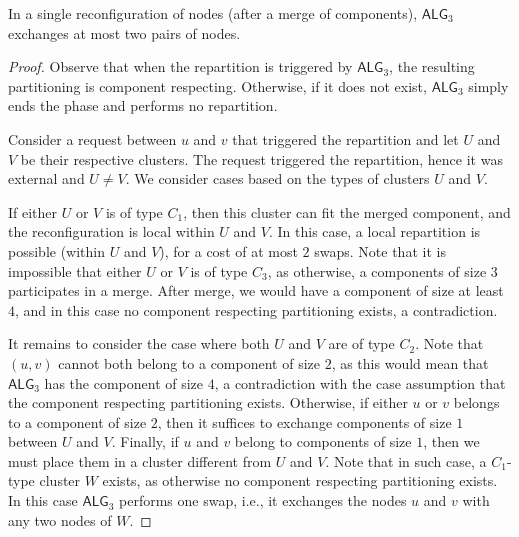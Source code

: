 \documentclass[a4paper,anonymous,USenglish]{lipics-v2019}
\newcommand{\TAlg}{{\ensuremath{\textsf{ALG}_{3}}}\xspace}
\begin{document}
\begin{lemma}
	\label{lem:1req}
	In a single reconfiguration of nodes (after a merge of components), \TAlg exchanges at most two pairs of nodes.
\end{lemma}

\begin{proof}
	Observe that when the repartition is triggered by \TAlg, the resulting partitioning is component respecting.
	Otherwise, if it does not exist, \TAlg simply ends the phase and performs no repartition.
	
	
	Consider a request between $u$ and $v$ that triggered the repartition and let $U$ and $V$ be their respective clusters.
	The request triggered the repartition, hence it was external and $U\neq V$.
	We consider cases based on the types of clusters $U$ and $V$.
	
	If either $U$ or $V$ is of type $C_1$, then this cluster can fit the merged component, and the reconfiguration is local within $U$ and $V$.
	In this case, a local repartition is possible (within $U$ and $V$), for a cost of at most $2$ swaps.
	Note that it is impossible that either $U$ or $V$ is of type $C_3$, as otherwise, a components of size $3$ participates in a merge.
	After merge, we would have a component of size at least $4$, and in this case no component respecting partitioning exists, a contradiction.
	
	
	It remains to consider the case where both $U$ and $V$ are of type $C_2$. Note that $(u,v)$ cannot both belong to a component of size $2$, as this would mean that \TAlg has the component of size $4$, a contradiction with the case assumption that the component respecting partitioning exists. 
	Otherwise, if either $u$ or $v$ belongs to a component of size $2$, then it suffices to exchange components of size $1$ between $U$ and $V$.
	Finally, if $u$ and $v$ belong to components of size $1$, then we must place them in a cluster different from $U$ and $V$.
	Note that in such case, a $C_1$-type cluster $W$ exists, as otherwise no component respecting partitioning exists. In this case \TAlg performs one swap, i.e., it exchanges the nodes $u$ and $v$ with any two nodes of $W$.
\end{proof}
\end{document}

